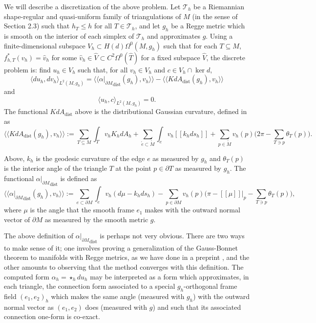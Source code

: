 \documentclass[11pt]{article}
\newcommand{\iprod}[1]{\langle #1 \rangle}
\begin{document}
We will describe a discretization of the above problem. Let $\mathcal{T}_h$ be a Riemannian shape-regular and quasi-uniform family of triangulations of $M$ (in the sense of Section 2.3) such that $h_T \le h$ for all $T \in \mathcal{T}_h$, and let $g_h$ be a Regge metric which is smooth on the interior of each simplex of $\mathcal{T}_h$ and approximates $g$. Using a finite-dimensional subspace $V_h \subset H(d)\Omega^0(M,g_h)$ such that for each $T \subseteq M$, $f_{h,T}^*(v_h) = \hat v_h$ for some $\hat v_h \in \hat V \subset C^2\Omega^0(\hat T)$ for a fixed subspace $\hat V$, the discrete problem is: find $u_h \in V_h$ such that, for all $v_h \in V_h$ and $c \in V_h \cap \ker d$,
\begin{equation}
\label{discreteform}\iprod{du_h,dv_h}_{L^2(M,g_h)} = \iprod{\iprod{{\alpha|_{\partial M}}_\mathrm{dist}(g_h),v_h}} -\iprod{\iprod{KdA_{\mathrm{dist}}(g_h),v_h}} 
\end{equation}
and
\begin{equation}\label{discreteformbc}\iprod{u_h,c}_{L^2(M,g_h)} = 0.\end{equation}
The functional $KdA_{\mathrm{dist}}$ above is the distributional Gaussian curvature, defined in \cite{BKGa22,GaNe22} as
\[
\iprod{\iprod{KdA_\mathrm{dist}(g_h),v_h}} := \sum_{T \subseteq M} \int_T v_hK_h dA_h + \sum_{\mathring{e} \subset \mathring{M}} \int_e v_h[\![k_hds_h]\!] + \sum_{p \in \mathring{M}} v_h(p)\Bigg(2\pi - \sum_{T \ni p}\theta_T(p)\Bigg).
\] 

Above, $k_h$ is the geodesic curvature of the edge $e$ as measured by $g_h$ and $\theta_T(p)$ is the interior angle of the triangle $T$ at the point $p \in \partial T$ as measured by $g_h$. The functional ${\alpha|_{\partial M}}_{\mathrm{dist}}$ is defined as
\[
\iprod{\iprod{{\alpha|_{\partial M}}_\mathrm{dist}(g_h),v_h}} := \sum_{e \subset \partial M} \int_e v_h(d\mu - k_hds_h) - \sum_{p \in \partial M} v_h(p)\Bigg(\pi - [\![\mu]\!]|_p - \sum_{T \ni p} \theta_T(p)\Bigg),
\]
where $\mu$ is the angle that the smooth frame $e_1$ makes with the outward normal vector of $\partial M$ as measured by the smooth metric $g$.


 The above definition of ${\alpha|_{\partial M}}_{\mathrm{dist}}$ is perhaps not very obvious. There are two ways to make sense of it; one involves proving a generalization of the Gauss-Bonnet theorem to manifolds with Regge metrics, as we have done in a preprint \cite{gawlik2025curvaturereggemetrics}, and the other amounts to observing that the method converges with this definition. The computed form $\alpha_h = \star_h du_h$ may be interpreted as a form which approximates, in each triangle, the connection form associated to a special $g_h$-orthogonal frame field $(e_1,e_2)_h$ which makes the same angle (measured with $g_h$) with the outward normal vector as $(e_1,e_2)$ does (measured with $g$) and such that its associated connection one-form is co-exact.
 
\end{document}
